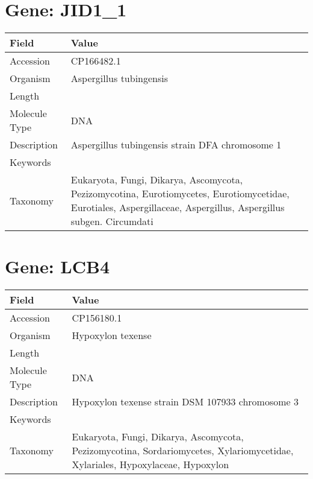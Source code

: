 \documentclass[10pt]{article}
\begin{document}
\section{Gene: JID1\_1}
{\footnotesize
\begin{longtable}{>{\raggedright\arraybackslash}p{4.5cm} >{\raggedright\arraybackslash}p{11.5cm}}
\textbf{Field} & \textbf{Value} \\
\hline
Accession & CP166482.1 \\
Organism & Aspergillus tubingensis \\
Length & 6137164 \\
Molecule Type & DNA \\
Description & Aspergillus tubingensis strain DFA chromosome 1 \\
Keywords &  \\
Taxonomy & Eukaryota, Fungi, Dikarya, Ascomycota, Pezizomycotina, Eurotiomycetes, Eurotiomycetidae, Eurotiales, Aspergillaceae, Aspergillus, Aspergillus subgen. Circumdati \\
\end{longtable}
}

\vspace{1em}
\section{Gene: LCB4}
{\footnotesize
\begin{longtable}{>{\raggedright\arraybackslash}p{4.5cm} >{\raggedright\arraybackslash}p{11.5cm}}
\textbf{Field} & \textbf{Value} \\
\hline
Accession & CP156180.1 \\
Organism & Hypoxylon texense \\
Length & 5413564 \\
Molecule Type & DNA \\
Description & Hypoxylon texense strain DSM 107933 chromosome 3 \\
Keywords &  \\
Taxonomy & Eukaryota, Fungi, Dikarya, Ascomycota, Pezizomycotina, Sordariomycetes, Xylariomycetidae, Xylariales, Hypoxylaceae, Hypoxylon \\
\end{longtable}
}

\vspace{1em}
\end{document}
